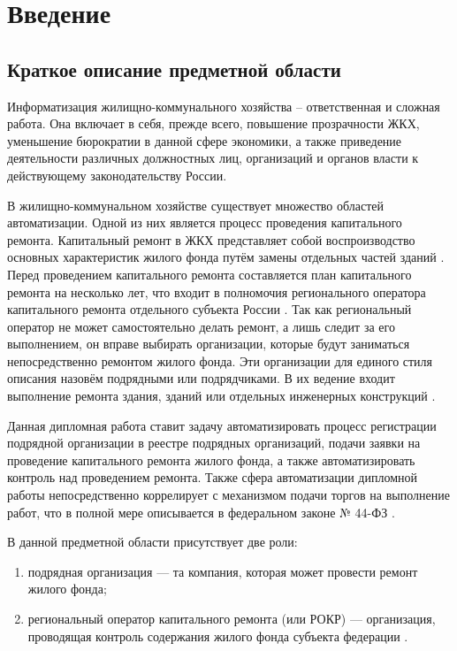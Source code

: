 \section*{Введение}

\subsection*{Краткое описание предметной области}

Информатизация жилищно-коммунального хозяйства – ответственная и сложная работа.
Она включает в себя, прежде всего, повышение прозрачности ЖКХ, уменьшение бюрократии в данной сфере экономики, а также приведение деятельности различных должностных лиц, организаций и органов власти к действующему законодательству России.

В жилищно-коммунальном хозяйстве существует множество областей автоматизации.
Одной из них является процесс проведения капитального ремонта.
Капитальный ремонт в ЖКХ представляет собой воспроизводство основных характеристик жилого фонда путём замены отдельных частей зданий \cite{economicdict}.
Перед проведением капитального ремонта составляется план капитального ремонта на несколько лет, что входит в полномочия регионального оператора капитального ремонта отдельного субъекта России \cite[ст. 180]{fz188}.
Так как региональный оператор не может самостоятельно делать ремонт, а лишь следит за его выполнением, он вправе выбирать организации, которые будут заниматься непосредственно ремонтом жилого фонда.
Эти организации для единого стиля описания назовём подрядными или подрядчиками.
В их ведение входит выполнение ремонта здания, зданий или отдельных инженерных конструкций \cite{analog_spb}.

Данная дипломная работа ставит задачу автоматизировать процесс регистрации подрядной организации в реестре подрядных организаций, подачи заявки на проведение капитального ремонта жилого фонда, а также автоматизировать контроль над проведением ремонта.
Также сфера автоматизации дипломной работы непосредственно коррелирует с механизмом подачи торгов на выполнение работ, что в полной мере описывается в федеральном законе № 44-ФЗ \cite{fz44}.

В данной предметной области присутствует две роли:

\begin{enumerate}
	\item подрядная организация --- та компания, которая может провести ремонт жилого фонда;
	\item региональный оператор капитального ремонта (или РОКР) --- организация, проводящая контроль содержания жилого фонда субъекта федерации \cite[ст. 178, ст.180]{fz188}.
\end{enumerate}

